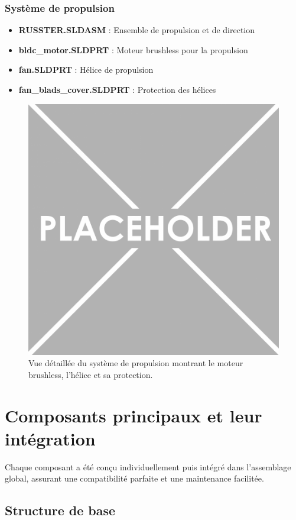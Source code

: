 {\subsubsection{Système de propulsion}
\begin{itemize}
    \setlength{\itemsep}{.375em}
    \item \textbf{RUSSTER.SLDASM} : Ensemble de propulsion et de direction
    \item \textbf{bldc\_motor.SLDPRT} : Moteur brushless pour la propulsion
    \item \textbf{fan.SLDPRT} : Hélice de propulsion
    \item \textbf{fan\_blads\_cover.SLDPRT} : Protection des hélices
\end{itemize}

\begin{figure}[!htpb]
    \centering
    \includegraphics[width=0.7\linewidth]{Figures/PezizaTuberosa.jpg}
    \caption[Système de propulsion]{Vue détaillée du système de propulsion montrant le moteur brushless, l'hélice et sa protection.}
    \label{fig:propulsion-system}
\end{figure}

\section{Composants principaux et leur intégration}
Chaque composant a été conçu individuellement puis intégré dans l'assemblage global, assurant une compatibilité parfaite et une maintenance facilitée.

\subsection{Structure de base}
}
